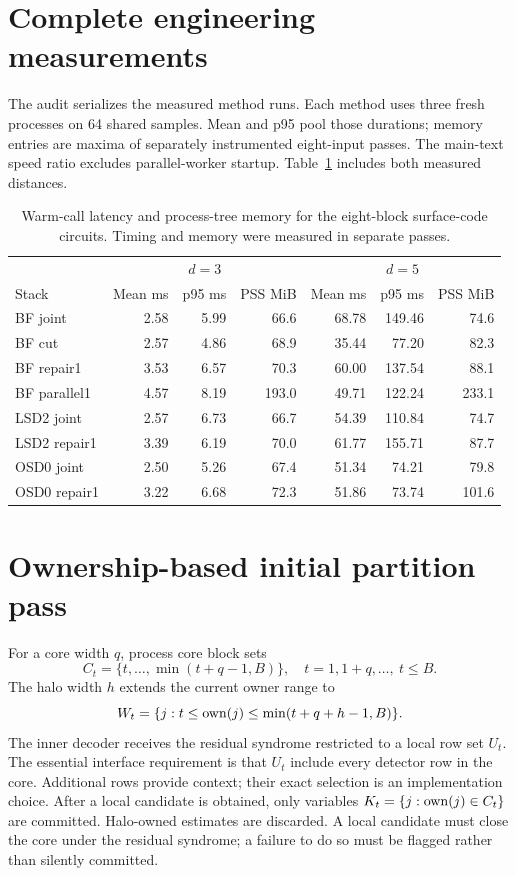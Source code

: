 \section{Complete engineering measurements}\label{app:engineering}
The audit serializes the measured method runs. Each method uses three fresh processes on 64 shared samples. Mean and p95 pool those durations; memory entries are maxima of separately instrumented eight-input passes. The main-text speed ratio excludes parallel-worker startup. Table~\ref{tab:engineering} includes both measured distances.
\begin{table}[t]\centering\small
\caption{Warm-call latency and process-tree memory for the eight-block surface-code circuits. Timing and memory were measured in separate passes.}\label{tab:engineering}
\begin{tabular}{lrrrrrr}\toprule
&\multicolumn{3}{c}{$d=3$}&\multicolumn{3}{c}{$d=5$}\\
Stack&Mean ms&p95 ms&PSS MiB&Mean ms&p95 ms&PSS MiB\\\midrule
BF joint&2.58&5.99&66.6&68.78&149.46&74.6\\
BF cut&2.57&4.86&68.9&35.44&77.20&82.3\\
BF repair1&3.53&6.57&70.3&60.00&137.54&88.1\\
BF parallel1&4.57&8.19&193.0&49.71&122.24&233.1\\
LSD2 joint&2.57&6.73&66.7&54.39&110.84&74.7\\
LSD2 repair1&3.39&6.19&70.0&61.77&155.71&87.7\\
OSD0 joint&2.50&5.26&67.4&51.34&74.21&79.8\\
OSD0 repair1&3.22&6.68&72.3&51.86&73.74&101.6\\\bottomrule
\end{tabular}\end{table}

\section{Ownership-based initial partition pass}\label{app:initial}
For a core width $q$, process core block sets
\[C_t=\{t,\ldots,\min(t+q-1,B)\},\quad t=1,1+q,\ldots,\ t\le B.\]
The halo width $h$ extends the current owner range to
\begin{equation}W_t=\{j:t\le\operatorname{own}(j)\le\min(t+q+h-1,B)\}.\label{eq:halo}\end{equation}
The inner decoder receives the residual syndrome restricted to a local row set $U_t$. The essential interface requirement is that $U_t$ include every detector row in the core. Additional rows provide context; their exact selection is an implementation choice. After a local candidate is obtained, only variables $K_t=\{j:\operatorname{own}(j)\in C_t\}$ are committed. Halo-owned estimates are discarded. A local candidate must close the core under the residual syndrome; a failure to do so must be flagged rather than silently committed.

